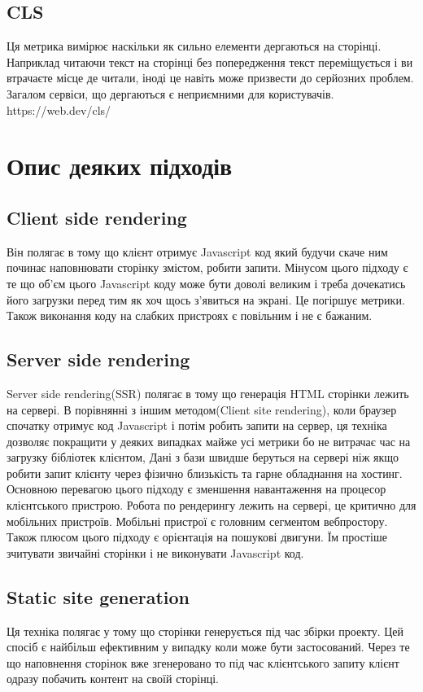 \subsection{CLS}
Ця метрика вимірює наскільки як сильно елементи дергаються на сторінці.
Наприклад читаючи текст на сторінці без попередження текст переміщується і ви втрачаєте місце де читали,
іноді це навіть може призвести до серйозних проблем.
Загалом сервіси, що дергаються є неприємними для користувачів. https://web.dev/cls/
\section{Опис деяких підходів}
\subsection{Client side rendering}
Він полягає в тому що клієнт отримує Javascript код який будучи скаче ним починає наповнювати сторінку змістом, робити запити.
Мінусом цього підходу є те що об'єм цього Javascript коду може бути доволі великим і треба дочекатись його загрузки перед тим як хоч щось з'явиться на экрані.
Це погіршує метрики.
Також виконання коду на слабких пристроях є повільним і не є бажаним.

\subsection{Server side rendering}
Server side rendering(SSR) полягає в тому що генерація HTML сторінки лежить на сервері.
В порівнянні з іншим методом(Client site rendering), коли браузер спочатку отримує код Javascript і потім робить запити на сервер,
ця техніка дозволяє покращити у деяких випадках майже усі метрики бо не витрачає час на загрузку бібліотек клієнтом,
Дані з бази швидше беруться на сервері ніж якщо робити запит клієнту через фізично близькість та гарне обладнання на хостинг.
Основною перевагою цього підходу є зменшення навантаження на процесор клієнтського пристрою.
Робота по рендерингу лежить на сервері, це критично для мобільних пристроїв.
Мобільні пристрої є головним сегментом вебпростору.
Також плюсом цього підходу є орієнтація на пошукові двигуни.
Їм простіше зчитувати звичайні сторінки і не виконувати Javascript код.

\subsection{Static site generation}
Ця техніка полягає у тому що сторінки генерується під час збірки проекту. Цей спосіб є найбільш ефективним у випадку коли може бути застосований.
Через те що наповнення сторінок вже згенеровано то під час клієнтського запиту клієнт одразу побачить контент на своїй сторінці.

